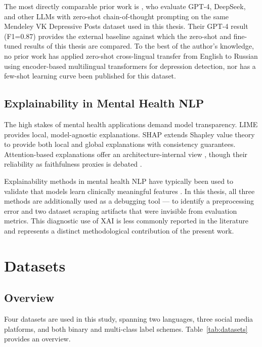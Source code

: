 \documentclass[12pt, a4paper, oneside]{report}
\begin{document}
The most directly comparable prior work is \citet{raihan2025}, who evaluate GPT-4, DeepSeek, and other LLMs with zero-shot chain-of-thought prompting on the same Mendeley VK Depressive Posts dataset used in this thesis. Their GPT-4 result (F1=0.87) provides the external baseline against which the zero-shot and fine-tuned results of this thesis are compared. To the best of the author's knowledge, no prior work has applied zero-shot cross-lingual transfer from English to Russian using encoder-based multilingual transformers for depression detection, nor has a few-shot learning curve been published for this dataset.

\section{Explainability in Mental Health NLP}

The high stakes of mental health applications demand model transparency. LIME \citep{ribeiro2016should} provides local, model-agnostic explanations. SHAP \citep{lundberg2017unified} extends Shapley value theory to provide both local and global explanations with consistency guarantees. Attention-based explanations offer an architecture-internal view \citep{clark2019does}, though their reliability as faithfulness proxies is debated \citep{jain2019attention}.

Explainability methods in mental health NLP have typically been used to validate that models learn clinically meaningful features \citep{ji2022survey}. In this thesis, all three methods are additionally used as a debugging tool — to identify a preprocessing error and two dataset scraping artifacts that were invisible from evaluation metrics. This diagnostic use of XAI is less commonly reported in the literature and represents a distinct methodological contribution of the present work.

\chapter{Datasets}
\label{ch:data}

\section{Overview}

Four datasets are used in this study, spanning two languages, three social media platforms, and both binary and multi-class label schemes. Table~\ref{tab:datasets} provides an overview.
\end{document}
